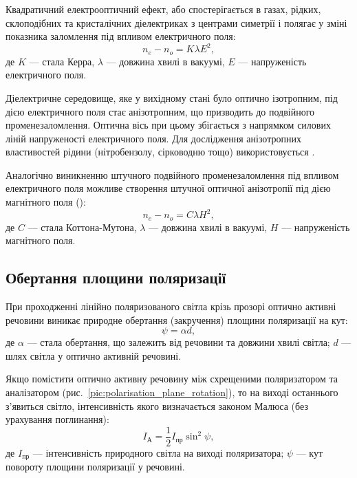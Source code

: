 \medskip

Квадратичний електрооптичний ефект, або  спостерігається в газах, рідких, склоподібних та кристалічних діелектриках з центрами симетрії і полягає у зміні показника заломлення під впливом електричного поля:
\begin{equation}\label{eq:kerr_effect}
    n_e - n_o = K\lambda E^2,
\end{equation}
де $K$ --- стала Керра, $ \lambda $ --- довжина хвилі в вакуумі, $ E $ --- напруженість електричного поля.

Діелектричне середовище, яке у вихідному стані було оптично ізотропним, під дією електричного поля стає анізотропним, що призводить до подвійного променезаломлення. Оптична вісь при цьому збігається з напрямком силових ліній напруженості електричного поля. Для дослідження анізотропних властивостей рідини (нітробензолу, сірководню тощо) використовується .

\medskip

Аналогічно виникненню штучного подвійного променезаломлення
під впливом електричного поля можливе створення
штучної оптичної анізотропії під дією магнітного поля ():
\begin{equation}\label{eq:cotton-mutton_effect}
    n_e - n_o = C\lambda H^2,
\end{equation}
де $C$ --- стала Коттона-Мутона, $ \lambda $ --- довжина хвилі в вакуумі, $ H $ --- напруженість магнітного поля.





\subsection*{Обертання площини поляризації}


При проходженні лінійно поляризованого світла крізь прозорі
оптично активні речовини виникає природне обертання (закручення)
площини поляризації на кут:
\begin{equation}\label{eq:rotation_angle}
    \psi = \alpha d,
\end{equation}
де $ \alpha $ --- стала обертання, що залежить від речовини та довжини хвилі світла;
$ d $ --- шлях світла у оптично активній речовині.

Якщо помістити оптично активну речовину між схрещеними
поляризатором та аналізатором (рис.~\ref{pic:polarisation_plane_rotation}), то на виході останнього з’явиться світло, інтенсивність якого визначається законом Малюса (без урахування поглинання):
\begin{equation}\label{}
    I_\text{А} = \frac12 I_\text{пр} \sin^2\psi,
\end{equation}
де $ I_\text{пр} $ --- інтенсивність природного світла на виході поляризатора; $ \psi $ --- кут повороту площини поляризації у речовині.

